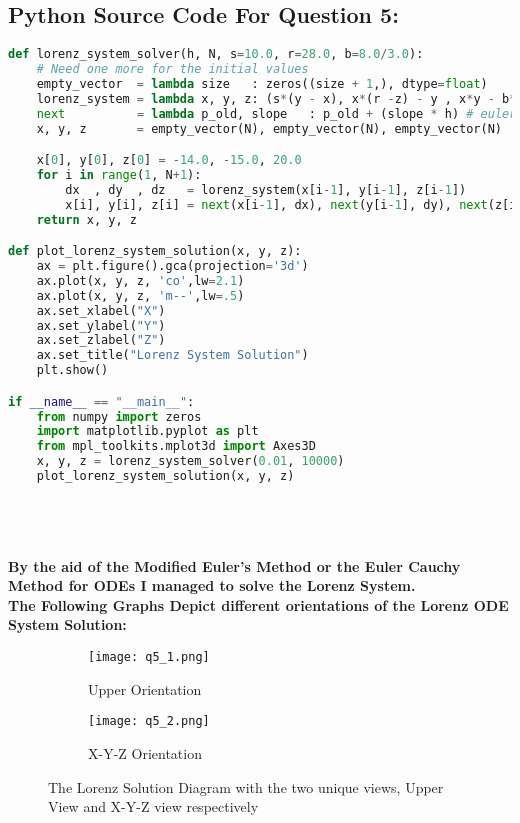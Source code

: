 \documentclass{article}
\begin{document}
\subsection*{Python Source Code For Question 5: }
\begin{lstlisting}[language=Python]
def lorenz_system_solver(h, N, s=10.0, r=28.0, b=8.0/3.0):
    # Need one more for the initial values
    empty_vector  = lambda size   : zeros((size + 1,), dtype=float)
    lorenz_system = lambda x, y, z: (s*(y - x), x*(r -z) - y , x*y - b*z)
    next          = lambda p_old, slope   : p_old + (slope * h) # euler's Method
    x, y, z       = empty_vector(N), empty_vector(N), empty_vector(N)

    x[0], y[0], z[0] = -14.0, -15.0, 20.0
    for i in range(1, N+1):
        dx  , dy  , dz   = lorenz_system(x[i-1], y[i-1], z[i-1])
        x[i], y[i], z[i] = next(x[i-1], dx), next(y[i-1], dy), next(z[i-1], dz)
    return x, y, z

def plot_lorenz_system_solution(x, y, z):
    ax = plt.figure().gca(projection='3d')
    ax.plot(x, y, z, 'co',lw=2.1)
    ax.plot(x, y, z, 'm--',lw=.5)
    ax.set_xlabel("X")
    ax.set_ylabel("Y")
    ax.set_zlabel("Z")
    ax.set_title("Lorenz System Solution")
    plt.show()

if __name__ == "__main__":
    from numpy import zeros
    import matplotlib.pyplot as plt
    from mpl_toolkits.mplot3d import Axes3D
    x, y, z = lorenz_system_solver(0.01, 10000)
    plot_lorenz_system_solution(x, y, z)
\end{lstlisting}
\textbf{\\ \\ \\ By the aid of the Modified Euler's Method or the Euler Cauchy Method for ODEs I managed to solve the Lorenz System.\\The Following Graphs Depict different orientations of the Lorenz ODE System Solution:}
\begin{center}
\begin{figure}[h]
    \begin{subfigure}{\textwidth}
        \texttt{[image: q5\_1.png]} 
        \caption{ Upper Orientation }
        \label{fig:subim1}
    \end{subfigure}
    \begin{subfigure}{\textwidth}
        \texttt{[image: q5\_2.png]} 
        \caption{ X-Y-Z Orientation }
        \label{fig:subim1}
    \end{subfigure}
\caption{The Lorenz Solution Diagram with the two unique views, Upper View and X-Y-Z view respectively }
\label{fig:image2}
\end{figure}
\end{center}
\end{document}

